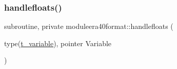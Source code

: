 \mbox{\label{namespacemoduleera40format_a9389939d144e12060ff692086e9af89e}} 
\subsubsection{\texorpdfstring{handlefloats()}{handlefloats()}}
{\footnotesize\ttfamily subroutine, private moduleera40format\+::handlefloats (\begin{DoxyParamCaption}\item[{type(\mbox{\hyperlink{structmoduleera40format_1_1t__variable}{t\+\_\+variable}}), pointer}]{Variable }\end{DoxyParamCaption})\hspace{0.3cm}{\ttfamily [private]}}

